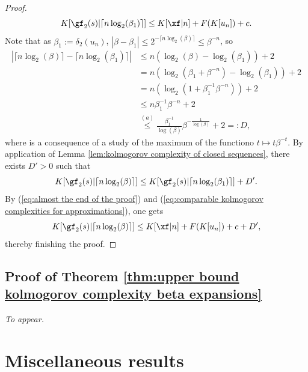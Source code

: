 \begin{proof}
 \begin{equation}\label{eq:almost the end of the proof}
		K[\gf_2(s)|\lceil n \log_2(\beta_1) \rceil] \leq K[\xf|n] + F(K[u_n]) + c.
 \end{equation}
 Note that as $\beta_1 := \delta_2(u_n)$, $|\beta - \beta_1| \leq 2^{-\lceil n \log_2(\beta)\rceil} \leq \beta^{-n}$, so
 \begin{align}
	\left|\lceil n \log_2(\beta) \rceil - \lceil n \log_2(\beta_1) \rceil\right| & \leq n (\log_2(\beta) - \log_2(\beta_1)) + 2\\
	& = n (\log_2(\beta_1 + \beta^{-n}) - \log_2(\beta_1)) + 2\\
	& = n (\log_2(1 + \beta_1^{-1}\beta^{-n})) + 2 \\
	&\leq n \beta_1^{-1}\beta^{-n} + 2\\
	&\overset{(a)}{\leq} \frac{\beta_1^{-1}}{\log(\beta)}\beta^{-\frac{1}{\log(\beta)}} + 2 =: D,
 \end{align}
 where is a consequence of a study of the maximum of the functiono $t \mapsto t\beta^{-t}$. By application of Lemma \ref{lem:kolmogorov complexity of closed sequences}, there exists $D' > 0$ such that
 \begin{equation}\label{eq:comparable kolmogorov complexities for approximations}
	K[\gf_2(s)|\lceil n \log_2(\beta) \rceil] \leq K[\gf_2(s)|\lceil n \log_2(\beta_1) \rceil] + D'.
 \end{equation}
By (\ref{eq:almost the end of the proof}) and (\ref{eq:comparable kolmogorov complexities for approximations}), one gets
\begin{equation}
	K[\gf_2(s)|\lceil n \log_2(\beta) \rceil] \leq K[\xf|n] + F(K[u_n]) + c + D',
\end{equation}
thereby finishing the proof.
\end{proof}

\subsection{Proof of Theorem \ref{thm:upper bound kolmogorov complexity beta expansions}}

\textit{To appear.}

\section{Miscellaneous results}


